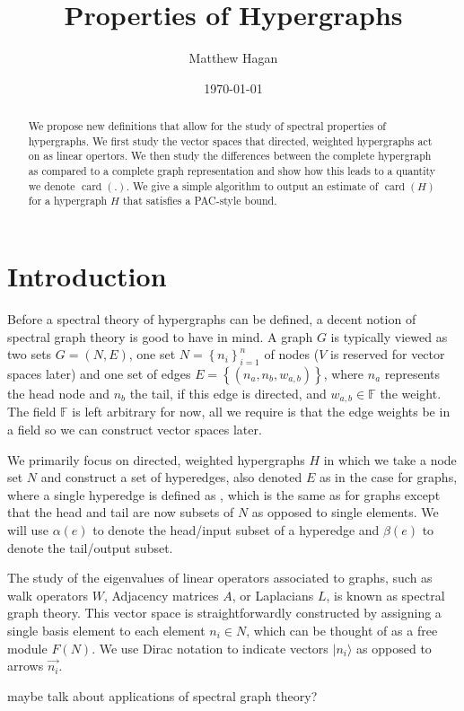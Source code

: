\documentclass{article}
\title{Properties of Hypergraphs}
\author{Matthew Hagan}
\date{\today}
\newcommand{\ket}[1]{|#1\rangle}
\newcommand{\set}[1]{\left\{ #1 \right\}}
\newcommand{\field}{\mathbb{F}}
\DeclareMathOperator{\card}{card}
\begin{document}
\maketitle
\begin{abstract}
	We propose new definitions that allow for the study of spectral properties of hypergraphs. We first study the vector spaces that directed, weighted hypergraphs act on as linear opertors. We then study the differences between the complete hypergraph as compared to a complete graph representation and show how this leads to a quantity we denote $\card(.)$.
    We give a simple algorithm to output an estimate of $\card(H)$ for a hypergraph $H$ that satisfies a PAC-style bound.
\end{abstract}

\section{Introduction}
Before a spectral theory of hypergraphs can be defined, a decent notion of spectral graph theory is good to have in mind. A graph $G$ is typically viewed as two sets $G = (N, E)$, one set $N = \set{n_i}_{i=1}^n$ of nodes ($V$ is reserved for vector spaces later) and one set of edges $E = \set{(n_a, n_b, w_{a,b})}$, where $n_a$ represents the head node and $n_b$ the tail, if this edge is directed, and $w_{a,b} \in \field$ the weight. The field $\field$ is left arbitrary for now, all we require is that the edge weights be in a field so we can construct vector spaces later.

We primarily focus on directed, weighted hypergraphs $H$ in which we take a node set $N$ and construct a set of hyperedges, also denoted $E$ as in the case for graphs, where a single hyperedge is defined as , which is the same as for graphs except that the head and tail are now subsets of $N$ as opposed to single elements. We will use $\alpha(e)$ to denote the head/input subset of a hyperedge and $\beta(e)$ to denote the tail/output subset. 

The study of the eigenvalues of linear operators associated to graphs, such as walk operators $W$, Adjacency matrices $A$, or Laplacians $L$, is known as spectral graph theory. This vector space is straightforwardly constructed by assigning a single basis element to each element $n_i \in N$, which can be thought of as a free module $F(N)$. We use Dirac notation to indicate vectors $\ket{n_i}$ as opposed to arrows $\vec{n_i}$. 

maybe talk about applications of spectral graph theory?
\end{document}
